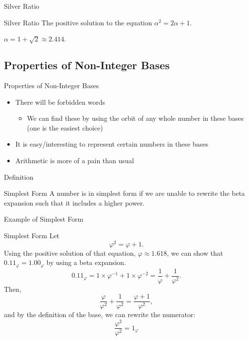 \documentclass{beamer}
\begin{document}
\begin{frame}{Silver Ratio}
  \begin{block}{Silver Ratio}
    The positive solution to the equation $\alpha^2 = 2\alpha + 1$.

    $\alpha = 1+\sqrt{2} \approx 2.414$.
  \end{block}
\end{frame}









\subsection{Properties of Non-Integer Bases}
\begin{frame}{Properties of Non-Integer Bases}
  \begin{itemize}
    \item There will be forbidden words \pause
    \begin{itemize}
      \item We can find these by using the orbit of any whole number in these bases (one is the easiest choice) \pause
    \end{itemize}
    \item It is easy/interesting to represent certain numbers in these bases \pause
    \item Arithmetic is more of a pain than usual
  \end{itemize}
\end{frame}

\begin{frame}{Definition}
  \begin{block}{Simplest Form}
    A number is in simplest form if we are unable to rewrite the beta expansion such that it includes a higher power.
  \end{block}
\end{frame}

\begin{frame}{Example of Simplest Form}
  \begin{block}{Simplest Form}
    Let $$\varphi^2 = \varphi + 1.$$ \pause
    Using the positive solution of that equation, $\varphi \approx 1.618$, we can show that $0.11_\varphi = 1.00_\varphi$ by using a beta expansion. \pause
    $$0.11_\varphi = 1\times\varphi^{-1} + 1\times\varphi^{-2} = \frac{1}{\varphi} + \frac{1}{\varphi^2}.$$ \pause
    Then,
    $$\frac{\varphi}{\varphi^2} + \frac{1}{\varphi^2} = \frac{\varphi+1}{\varphi^2},$$\pause
    and by the definition of the base, we can rewrite the numerator:
    $$\frac{\varphi^2}{\varphi^2} = 1_\varphi$$
  \end{block}
\end{frame}
\end{document}
